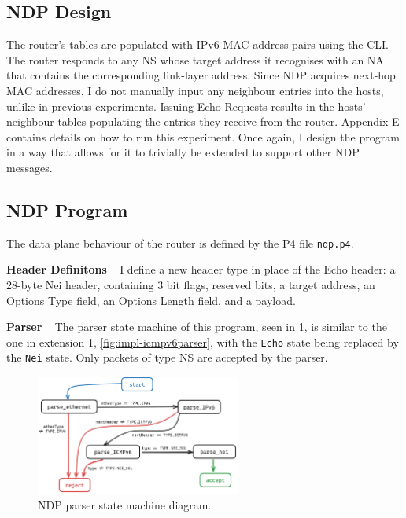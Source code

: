 \subsection{NDP Design}
\label{sec:3.6.2}

The router's tables are populated with IPv6-MAC address pairs using the CLI. The router responds to any NS whose target address it recognises with an NA that contains the corresponding link-layer address. Since NDP acquires next-hop MAC addresses, I do not manually input any neighbour entries into the hosts, unlike in previous experiments. Issuing Echo Requests results in the hosts’ neighbour tables populating the entries they receive from the router. Appendix E contains details on how to run this experiment. Once again, I design the program in a way that allows for it to trivially be extended to support other NDP messages.



\subsection{NDP Program}
\label{sec:3.6.3}

The data plane behaviour of the router is defined by the P4 file \texttt{ndp.p4}.

\textbf{Header Definitons} ~ I define a new header type in place of the Echo header: a 28-byte Nei header, containing 3 bit flags, reserved bits, a target address, an Options Type field, an Options Length field, and a payload.

\textbf{Parser} ~ The parser state machine of this program, seen in \cref{fig:impl-ndpparser}, is similar to the one in extension 1, \cref{fig:impl-icmpv6parser}, with the \texttt{Echo} state being replaced by the \texttt{Nei} state. Only packets of type NS are accepted by the parser.

\begin{figure}[htbp]
  \centering
    \includegraphics[width=0.60\textwidth]{figures/implementation/ndp_parser.jpg}
     \caption{NDP parser state machine diagram.}
     \label{fig:impl-ndpparser}
\end{figure}

